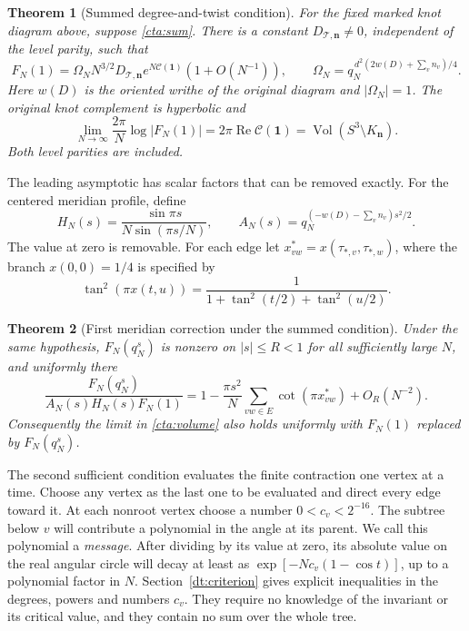 \documentclass[11pt]{article}
\numberwithin{equation}{section}
\newtheorem{theorem}{Theorem}[section]
\theoremstyle{definition}\newtheorem{definition}[theorem]{Definition}
\theoremstyle{remark}\newtheorem{remark}[theorem]{Remark}
\newcommand{\Rea}{\operatorname{Re}}
\newcommand{\Vol}{\operatorname{Vol}}
\newcommand{\calC}{\mathcal C}
\begin{document}
\begin{theorem}[Summed degree-and-twist condition]\label{cta:main}
For the fixed marked knot diagram above, suppose \eqref{cta:sum}.
There is a constant \(D_{\mathcal T,\mathbf n}\ne0\), independent
of the level parity, such that
\begin{equation}\label{cta:leading}
 F_N(1)=\Omega_N N^{3/2}D_{\mathcal T,\mathbf n}
            e^{N\calC(\mathbf1)}(1+O(N^{-1})),\qquad
 \Omega_N=q_N^{\,d^2(2w(D)+\sum_vn_v)/4}.
\end{equation}
Here \(w(D)\) is the oriented writhe of the original diagram and
\(|\Omega_N|=1\).
The original knot complement is hyperbolic and
\begin{equation}\label{cta:volume}
 \lim_{N\to\infty}\frac{2\pi}{N}\log|F_N(1)|
       =2\pi\Rea\calC(\mathbf1)
       =\Vol(S^3\setminus K_{\mathbf n}).
\end{equation}
Both level parities are included.
\end{theorem}

The leading asymptotic has scalar factors that can be removed exactly.
For the centered meridian profile, define
\begin{equation}\label{dt:scalars}
 H_N(s)=\frac{\sin\pi s}{N\sin(\pi s/N)},\qquad
 A_N(s)=q_N^{(-w(D)-\sum_vn_v)s^2/2}.
\end{equation}
The value at zero is removable. For each edge let
\(x_{vw}^*=x(\tau_{*,v},\tau_{*,w})\), where the branch \(x(0,0)=1/4\)
is specified by
\begin{equation}\label{cta:wire}
 \tan^2(\pi x(t,u))
     =\frac1{1+\tan^2(t/2)+\tan^2(u/2)}.
\end{equation}

\begin{theorem}[First meridian correction under the summed condition]\label{cta:profile}
Under the same hypothesis, \(F_N(q_N^s)\) is nonzero on
\(|s|\le R<1\) for all sufficiently large \(N\), and uniformly there
\begin{equation}\label{cta:profile-formula}
 \frac{F_N(q_N^s)}{A_N(s)H_N(s)F_N(1)}
 =1-\frac{\pi s^2}{N}\sum_{vw\in E}\cot(\pi x_{vw}^*)
                                      +O_R(N^{-2}).
\end{equation}
Consequently the limit in \eqref{cta:volume} also holds uniformly
with \(F_N(1)\) replaced by \(F_N(q_N^s)\).
\end{theorem}


The second sufficient condition evaluates the finite contraction one
vertex at a time. Choose any vertex as the last one to be evaluated
and direct every edge toward it. At each nonroot vertex choose a
number \(0<c_v<2^{-16}\). The subtree below $v$ will contribute a polynomial in the angle
at its parent. We call this polynomial a \emph{message}. After dividing
by its value at zero, its absolute value on the real angular circle
will decay at least as $\exp[-Nc_v(1-\cos t)]$, up to a polynomial
factor in $N$.
Section~\ref{dt:criterion} gives explicit inequalities in the degrees,
powers and numbers \(c_v\). They require no knowledge of the invariant
or its critical value, and they contain no sum over the whole tree.
\end{document}
